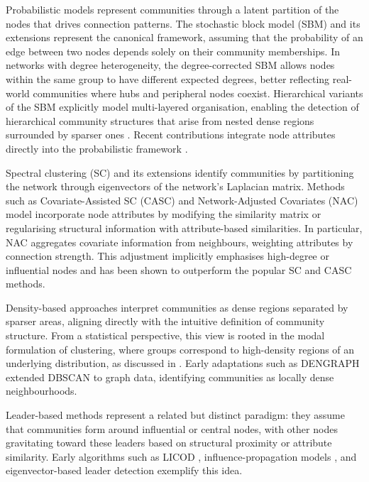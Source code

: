 \documentclass[11pt]{article}
\begin{document}
Probabilistic models represent communities through a latent partition of the nodes that drives connection patterns. The stochastic block model (SBM) and its extensions \citep{Lee2019} represent the canonical framework, assuming that the probability of an edge between two nodes depends solely on their community memberships. In networks with degree heterogeneity, the degree-corrected SBM \citep[DC-SBM,][]{Karrer2011StochasticNetworks} allows nodes within the same group to have different expected degrees, better reflecting real-world communities where hubs and peripheral nodes coexist.
Hierarchical variants of the SBM explicitly model multi-layered organisation, enabling the detection of hierarchical community structures that arise from nested dense regions surrounded by sparser ones \citep{Peixoto2014HierarchicalModels,Peixoto2019BayesianBlockmodeling,Come2021HierarchicalLikelihood}.
Recent contributions integrate node attributes directly into the probabilistic framework \citep{Stanley2019StochasticAttributes}.

Spectral clustering (SC) and its extensions identify communities by partitioning the network through eigenvectors of the network's Laplacian matrix. Methods such as Covariate-Assisted SC (CASC) \citep{Binkiewicz2017} and Network-Adjusted Covariates (NAC) model \citep{Hu2024Network-adjustedDetection} incorporate node attributes by modifying the similarity matrix or regularising structural information with attribute-based similarities. In particular, NAC aggregates covariate information from neighbours, weighting attributes by connection strength. This adjustment implicitly emphasises high-degree or influential nodes and has been shown to outperform the popular SC and CASC methods.

Density-based approaches interpret communities as dense regions separated by sparser areas, aligning directly with the intuitive definition of community structure. From a statistical perspective, this view is rooted in the modal formulation of clustering, where groups correspond to high-density regions of an underlying distribution, as discussed in \cite{Menardi2015}. Early adaptations such as DENGRAPH \citep{Falkowski2007DENGRAPH:Algorithm} extended DBSCAN \citep{Ester1996} to graph data, identifying communities as locally dense neighbourhoods.

Leader-based methods represent a related but distinct paradigm: they assume that communities form around influential or central nodes, with other nodes gravitating toward these leaders based on structural proximity or attribute similarity. Early algorithms such as LICOD \citep{Yakoubi2014LICOD:Networks}, influence-propagation models \citep{Helal2017LeaderbasedNetworks}, and eigenvector-based leader detection \citep{Ahajjam2018ANetworks} exemplify this idea. 
\end{document}
